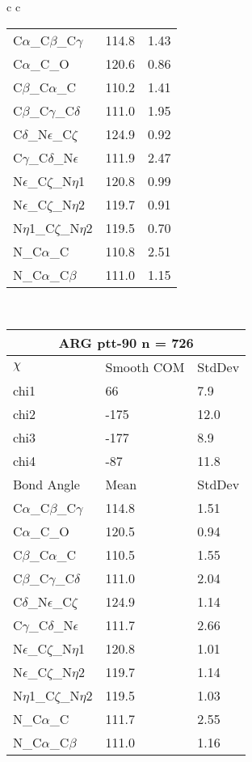 \begin{longtable}{ c c }
\begin{tabular}{ l l l }
  C$\alpha$\_C$\beta$\_C$\gamma$ & 114.8 & 1.43\\
  C$\alpha$\_C\_O & 120.6 & 0.86\\
  C$\beta$\_C$\alpha$\_C & 110.2 & 1.41\\
  C$\beta$\_C$\gamma$\_C$\delta$ & 111.0 & 1.95\\
  C$\delta$\_N$\epsilon$\_C$\zeta$ & 124.9 & 0.92\\
  C$\gamma$\_C$\delta$\_N$\epsilon$ & 111.9 & 2.47\\
  N$\epsilon$\_C$\zeta$\_N$\eta$1 & 120.8 & 0.99\\
  N$\epsilon$\_C$\zeta$\_N$\eta$2 & 119.7 & 0.91\\
  N$\eta$1\_C$\zeta$\_N$\eta$2 & 119.5 & 0.70\\
  N\_C$\alpha$\_C & 110.8 & 2.51\\
  N\_C$\alpha$\_C$\beta$ & 111.0 & 1.15\\
  \bottomrule
  \end{tabular}
  \\
  \begin{tabular}{ l l l }
  \toprule
  \multicolumn{3}{c}{ARG \textbf{ptt-90} n = 726} \\ \toprule
  $\chi$       & Smooth COM & StdDev \\ \midrule
  chi1 & 66 & 7.9 \\ 
  chi2 & -175 & 12.0 \\ 
  chi3 & -177 & 8.9 \\ 
  chi4 & -87 & 11.8 \\ \midrule
  Bond Angle   & Mean     & StdDev \\ \midrule
  C$\alpha$\_C$\beta$\_C$\gamma$ & 114.8 & 1.51\\
  C$\alpha$\_C\_O & 120.5 & 0.94\\
  C$\beta$\_C$\alpha$\_C & 110.5 & 1.55\\
  C$\beta$\_C$\gamma$\_C$\delta$ & 111.0 & 2.04\\
  C$\delta$\_N$\epsilon$\_C$\zeta$ & 124.9 & 1.14\\
  C$\gamma$\_C$\delta$\_N$\epsilon$ & 111.7 & 2.66\\
  N$\epsilon$\_C$\zeta$\_N$\eta$1 & 120.8 & 1.01\\
  N$\epsilon$\_C$\zeta$\_N$\eta$2 & 119.7 & 1.14\\
  N$\eta$1\_C$\zeta$\_N$\eta$2 & 119.5 & 1.03\\
  N\_C$\alpha$\_C & 111.7 & 2.55\\
  N\_C$\alpha$\_C$\beta$ & 111.0 & 1.16\\

\end{tabular}
\end{longtable}
